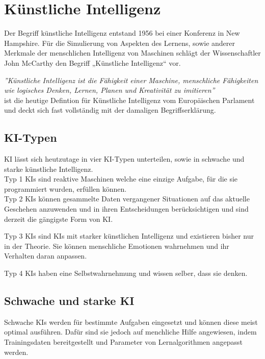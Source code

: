\section{Künstliche Intelligenz\label{sec:bb}}

Der Begriff künstliche Intelligenz entstand 1956 bei einer 
Konferenz in New Hampshire. Für die Simulierung von Aspekten des 
Lernens, sowie anderer Merkmale der menschlichen Intelligenz von 
Maschinen schlägt der Wissenschaftler John McCarthy den Begriff 
„Künstliche Intelligenz“ vor. 
\cite{WasIstKuenstliche2021} \cite{WhatAIBasica}

\textit{''Künstliche Intelligenz ist die Fähigkeit einer Maschine, 
menschliche Fähigkeiten wie logisches Denken, Lernen, Planen und 
Kreativität zu imitieren''} \\ \cite{WasIstKuenstliche2020}
ist die heutige Defintion für Künstliche Intelligenz vom Europäischen Parlament 
und deckt sich fast vollständig mit der damaligen Begriffserklärung.

\subsection{KI-Typen}
KI lässt sich heutzutage in vier KI-Typen unterteilen, 
sowie in schwache und starke künstliche Intelligenz.
\\

Typ 1 KIs sind reaktive 
Maschinen welche eine einzige Aufgabe, für die sie programmiert wurden, 
erfüllen können.
\\

Typ 2 KIs können gesammelte Daten vergangener 
Situationen auf das aktuelle Geschehen anzuwenden und 
in ihren Entscheidungen berücksichtigen und sind derzeit die gängigste Form von KI.

Typ 3 KIs sind KIs mit starker künstlichen Intelligenz und 
existieren bisher nur in der Theorie. 
Sie können menschliche Emotionen wahrnehmen und ihr Verhalten daran anpassen.

Typ 4 KIs haben eine Selbstwahrnehmung und wissen selber, dass sie denken. 
\cite{stadlerKuenstlicheIntelligenz}

\subsection{Schwache und starke KI}

Schwache KIs werden für bestimmte Aufgaben eingesetzt und 
können diese meist optimal ausführen. 
Dafür sind sie jedoch auf menchliche Hilfe angewiesen, 
indem Trainingsdaten bereitgestellt und 
Parameter von Lernalgorithmen angepasst werden.

